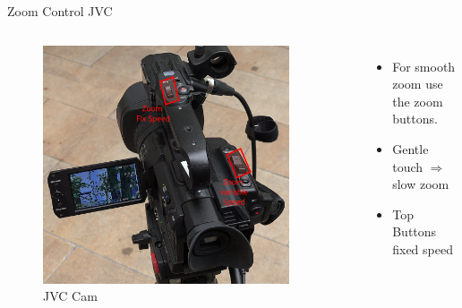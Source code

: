 \documentclass[aspectratio=169]{beamer}
\begin{document}
\begin{frame}{Zoom Control JVC}
	\begin{columns}[T,onlytextwidth]
	\begin{figure} 
		\centering
		\includegraphics[width=0.9\textwidth]{images/jvc_zoom.png}
		\caption{JVC Cam}
	\end{figure}
		\begin{itemize}
			\item For smooth zoom use the zoom buttons.
			\item Gentle touch $\Rightarrow$ slow zoom
			\item Top Buttons fixed speed
		\end{itemize}
	\end{columns}
\end{frame}


\end{document}

